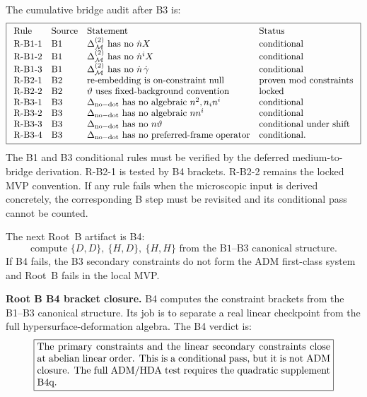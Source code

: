 \documentclass[11pt]{article}
\begin{document}
The cumulative bridge audit after B3 is:
\[
\boxed{
\begin{array}{llll}
\text{Rule} & \text{Source} & \text{Statement} & \text{Status}\\
\text{R-B1-1} & \text{B1} &
\Delta_{\mathcal M}^{(2)}\ \text{has no }\dot n X & \text{conditional}\\
\text{R-B1-2} & \text{B1} &
\Delta_{\mathcal M}^{(2)}\ \text{has no }\dot n^i X & \text{conditional}\\
\text{R-B1-3} & \text{B1} &
\Delta_{\mathcal M}^{(2)}\ \text{has no }\dot n\,\dot\gamma & \text{conditional}\\
\text{R-B2-1} & \text{B2} &
\text{re-embedding is on-constraint null} & \text{proven mod constraints}\\
\text{R-B2-2} & \text{B2} &
\vartheta\ \text{uses fixed-background convention} & \text{locked}\\
\text{R-B3-1} & \text{B3} &
\Delta_{\rm no-dot}\ \text{has no algebraic }n^2,n_in^i & \text{conditional}\\
\text{R-B3-2} & \text{B3} &
\Delta_{\rm no-dot}\ \text{has no algebraic }nn^i & \text{conditional}\\
\text{R-B3-3} & \text{B3} &
\Delta_{\rm no-dot}\ \text{has no }n\vartheta & \text{conditional under shift}\\
\text{R-B3-4} & \text{B3} &
\Delta_{\rm no-dot}\ \text{has no preferred-frame operator} & \text{conditional}.
\end{array}}
\]
The B1 and B3 conditional rules must be verified by the deferred
medium-to-bridge derivation.  R-B2-1 is tested by B4 brackets.  R-B2-2 remains
the locked MVP convention.  If any rule fails when the microscopic input is
derived concretely, the corresponding B step must be revisited and its
conditional pass cannot be counted.

The next Root~B artifact is B4:
\[
\boxed{
\text{compute }\{D,D\},\ \{H,D\},\ \{H,H\}
\text{ from the B1--B3 canonical structure.}
}
\]
If B4 fails, the B3 secondary constraints do not form the ADM first-class
system and Root~B fails in the local MVP.

\medskip\noindent\textbf{Root B B4 bracket closure.}
B4 computes the constraint brackets from the B1--B3 canonical structure.  Its
job is to separate a real linear checkpoint from the full
hypersurface-deformation algebra.  The B4 verdict is:
\[
\boxed{
\begin{minipage}{0.86\linewidth}
The primary constraints and the linear secondary constraints close at
abelian linear order.  This is a conditional pass, but it is not ADM closure.
The full ADM/HDA test requires the quadratic supplement B4q.
\end{minipage}}
\]
\end{document}
